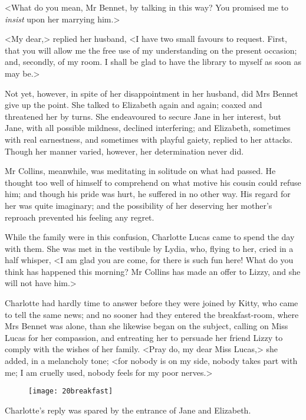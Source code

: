 <What do you mean, Mr Bennet, by talking in this way? You promised me to \textit{insist} upon her marrying him.>

<My dear,> replied her husband, <I have two small favours to request. First, that you will allow me the free use of my understanding on the present occasion; and, secondly, of my room. I shall be glad to have the library to myself as soon as may be.>

Not yet, however, in spite of her disappointment in her husband, did Mrs Bennet give up the point. She talked to Elizabeth again and again; coaxed and threatened her by turns. She endeavoured to secure Jane in her interest, but Jane, with all possible mildness, declined interfering; and Elizabeth, sometimes with real earnestness, and sometimes with playful gaiety, replied to her attacks. Though her manner varied, however, her determination never did.

Mr Collins, meanwhile, was meditating in solitude on what had passed. He thought too well of himself to comprehend on what motive his cousin could refuse him; and though his pride was hurt, he suffered in no other way. His regard for her was quite imaginary; and the possibility of her deserving her mother's reproach prevented his feeling any regret.

While the family were in this confusion, Charlotte Lucas came to spend the day with them. She was met in the vestibule by Lydia, who, flying to her, cried in a half whisper, <I am glad you are come, for there is such fun here! What do you think has happened this morning? Mr Collins has made an offer to Lizzy, and she will not have him.>

Charlotte had hardly time to answer before they were joined by Kitty, who came to tell the same news; and no sooner had they entered the breakfast-room, where Mrs Bennet was alone, than she likewise began on the subject, calling on Miss Lucas for her compassion, and entreating her to persuade her friend Lizzy to comply with the wishes of her family. <Pray do, my dear Miss Lucas,> she added, in a melancholy tone; <for nobody is on my side, nobody takes part with me; I am cruelly used, nobody feels for my poor nerves.>

\begin{figure}[tbh]
\centering
\texttt{[image: 20breakfast]}
\end{figure}

Charlotte's reply was spared by the entrance of Jane and Elizabeth.

